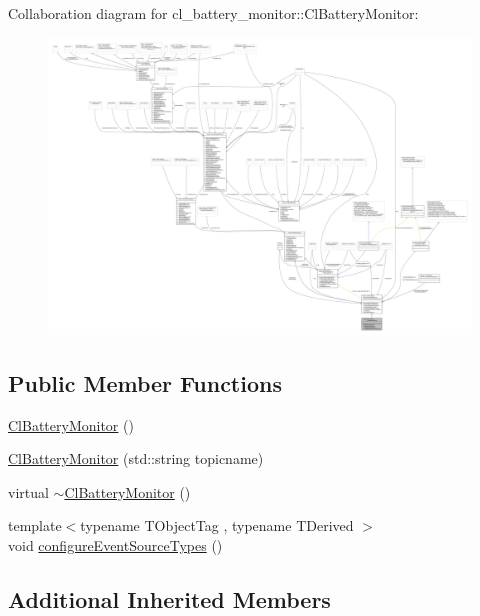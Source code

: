 Collaboration diagram for cl\+\_\+battery\+\_\+monitor\+:\+:Cl\+Battery\+Monitor\+:
\nopagebreak
\begin{figure}[H]
\begin{center}
\leavevmode
\includegraphics[width=350pt]{classcl__battery__monitor_1_1ClBatteryMonitor__coll__graph}
\end{center}
\end{figure}
\subsection*{Public Member Functions}
\begin{DoxyCompactItemize}
\item 
\hyperlink{classcl__battery__monitor_1_1ClBatteryMonitor_a31aa11369ec7327826ae0f7de3737a8c}{Cl\+Battery\+Monitor} ()
\item 
\hyperlink{classcl__battery__monitor_1_1ClBatteryMonitor_a71e2ced477a9d420691e000cf03a2e8e}{Cl\+Battery\+Monitor} (std\+::string topicname)
\item 
virtual \hyperlink{classcl__battery__monitor_1_1ClBatteryMonitor_a566d5dc4bb04330b4c54ee417e6664b3}{$\sim$\+Cl\+Battery\+Monitor} ()
\item 
{\footnotesize template$<$typename T\+Object\+Tag , typename T\+Derived $>$ }\\void \hyperlink{classcl__battery__monitor_1_1ClBatteryMonitor_ac2295f716c947bf0d067a03f455a5a83}{configure\+Event\+Source\+Types} ()
\end{DoxyCompactItemize}
\subsection*{Additional Inherited Members}


